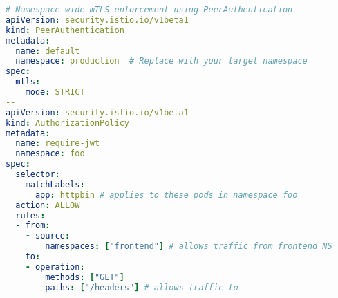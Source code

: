 \begin{lstlisting}[language=yaml]
# Namespace-wide mTLS enforcement using PeerAuthentication
apiVersion: security.istio.io/v1beta1
kind: PeerAuthentication
metadata:
  name: default
  namespace: production  # Replace with your target namespace
spec:
  mtls:
    mode: STRICT
--
apiVersion: security.istio.io/v1beta1
kind: AuthorizationPolicy
metadata:
  name: require-jwt
  namespace: foo
spec:
  selector:
    matchLabels:
      app: httpbin # applies to these pods in namespace foo
  action: ALLOW
  rules:
  - from:
    - source:
        namespaces: ["frontend"] # allows traffic from frontend NS
    to:
    - operation:
        methods: ["GET"]
        paths: ["/headers"] # allows traffic to
\end{lstlisting}
